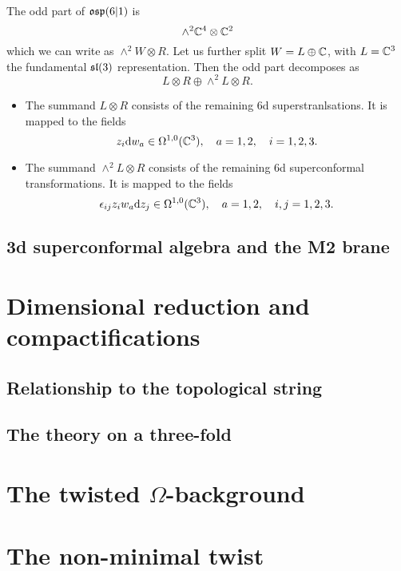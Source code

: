 \documentclass[11pt]{amsart}
\begin{document}
\parsec[]

The odd part of $\mathfrak{osp}(6|1)$ is 
\[
\wedge^2 \mathbb C^4 \otimes \mathbb C^2 
\]
which we can write as $\wedge^2 W \otimes R$. 
Let us further split $W = L \oplus \mathbb C$, with $L = \mathbb C^3$ the fundamental $\mathfrak{sl}(3)$ representation. 
Then the odd part decomposes as
\[
L \otimes R \oplus \wedge^2 L \otimes R .
\]


\begin{itemize} 
\item The summand $L \otimes R$ consists of the remaining 6d superstranlsations. 
It is mapped to the fields 
\[
z_i {\rm d} w_a \in \Omega^{1,0}(\mathbb C^3),\quad a=1,2, \quad i =1,2,3.
\] 
\item The summand $\wedge^2 L \otimes R$ consists of the remaining 6d superconformal transformations. 
It is mapped to the fields
\[
\epsilon_{ij} z_i w_a {\rm d} z_j \in \Omega^{1,0}(\mathbb C^3) , \quad a = 1,2, \quad i,j = 1,2,3. 
\]
\end{itemize}

\subsection{3d superconformal algebra and the M2 brane}


\section{Dimensional reduction and compactifications} 

\subsection{Relationship to the topological string}


\subsection{The theory on a three-fold}


\section{The twisted $\Omega$-background} 

\section{The non-minimal twist} 
\end{document}
